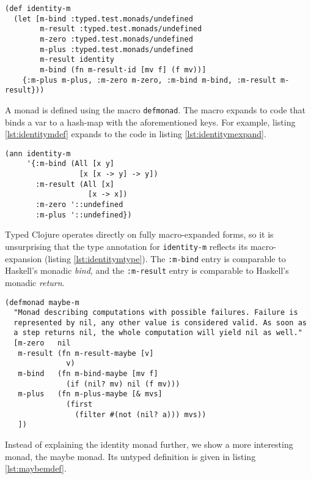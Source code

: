\begin{lstlisting}[caption=Macro expansion of identity monad definition, label=lst:identitymexpand]
(def identity-m
  (let [m-bind :typed.test.monads/undefined
        m-result :typed.test.monads/undefined
        m-zero :typed.test.monads/undefined
        m-plus :typed.test.monads/undefined
        m-result identity
        m-bind (fn m-result-id [mv f] (f mv))]
    {:m-plus m-plus, :m-zero m-zero, :m-bind m-bind, :m-result m-result}))
\end{lstlisting}

A monad is defined using the macro \lstinline|defmonad|. The macro expands to code that binds a var to a hash-map
with the aforementioned keys. For example, listing \ref{lst:identitymdef} expands to 
the code in listing \ref{lst:identitymexpand}.

\begin{lstlisting}[caption=Type for identity monad, label=lst:identitymtype]
(ann identity-m
     '{:m-bind (All [x y]
                 [x [x -> y] -> y])
       :m-result (All [x]
                   [x -> x])
       :m-zero '::undefined
       :m-plus '::undefined})
\end{lstlisting}

Typed Clojure operates directly on fully macro-expanded forms, so it is unsurprising that the type
annotation for \lstinline|identity-m| reflects its macro-expansion (listing \ref{lst:identitymtype}).
The \lstinline|:m-bind| entry is comparable to Haskell's monadic \emph{bind},
and the \lstinline|:m-result| entry is comparable to Haskell's monadic \emph{return}.

\begin{lstlisting}[caption=Maybe monad definition, label=lst:maybemdef]
(defmonad maybe-m
  "Monad describing computations with possible failures. Failure is
  represented by nil, any other value is considered valid. As soon as
  a step returns nil, the whole computation will yield nil as well."
  [m-zero   nil
   m-result (fn m-result-maybe [v] 
              v)
   m-bind   (fn m-bind-maybe [mv f]
              (if (nil? mv) nil (f mv)))
   m-plus   (fn m-plus-maybe [& mvs]
              (first 
                (filter #(not (nil? a))) mvs))
   ])
\end{lstlisting}

Instead of explaining the identity monad further, we show a more interesting monad, the maybe monad.
Its untyped definition is given in listing \ref{lst:maybemdef}.

